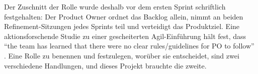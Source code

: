 Der Zuschnitt der Rolle wurde deshalb vor dem ersten Sprint schriftlich
festgehalten: Der Product Owner ordnet das Backlog allein, nimmt an beiden
Refinement-Sitzungen jedes Sprints teil und verteidigt das Produktziel. Eine
aktionsforschende Studie zu einer gescheiterten Agil-Einführung hält fest, dass
\enquote{the team has learned that there were no clear
rules/guidelines for PO to follow} \parencite[p.~15]{suryaatmaja2020}. Eine
Rolle zu benennen und festzulegen, worüber sie entscheidet, sind zwei
verschiedene Handlungen, und dieses Projekt brauchte die zweite.


%
%
%


